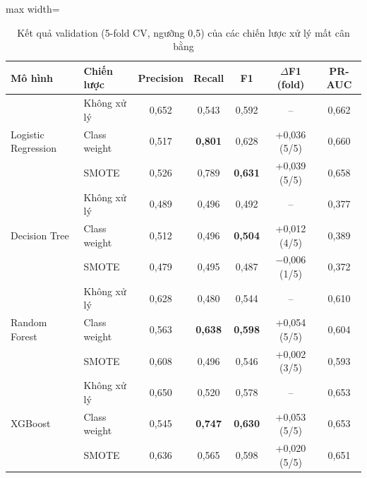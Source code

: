 \begin{table}[H]
\centering
\small
\begin{adjustbox}{max width=\textwidth}
\begin{tabular}{|l|l|c|c|c|c|c|}
\hline
\textbf{Mô hình} & \textbf{Chiến lược} & \textbf{Precision} & \textbf{Recall} & \textbf{F1} & \textbf{$\Delta$F1 (fold)} & \textbf{PR-AUC} \\
\hline
\multirow{3}{*}{Logistic Regression} & Không xử lý & 0,652 & 0,543 & 0,592 & -- & 0,662 \\
\cline{2-7}
 & Class weight & 0,517 & \textbf{0,801} & 0,628 & +0,036 (5/5) & 0,660 \\
\cline{2-7}
 & SMOTE & 0,526 & 0,789 & \textbf{0,631} & +0,039 (5/5) & 0,658 \\
\hline
\multirow{3}{*}{Decision Tree} & Không xử lý & 0,489 & 0,496 & 0,492 & -- & 0,377 \\
\cline{2-7}
 & Class weight & 0,512 & 0,496 & \textbf{0,504} & +0,012 (4/5) & 0,389 \\
\cline{2-7}
 & SMOTE & 0,479 & 0,495 & 0,487 & $-$0,006 (1/5) & 0,372 \\
\hline
\multirow{3}{*}{Random Forest} & Không xử lý & 0,628 & 0,480 & 0,544 & -- & 0,610 \\
\cline{2-7}
 & Class weight & 0,563 & \textbf{0,638} & \textbf{0,598} & +0,054 (5/5) & 0,604 \\
\cline{2-7}
 & SMOTE & 0,608 & 0,496 & 0,546 & +0,002 (3/5) & 0,593 \\
\hline
\multirow{3}{*}{XGBoost} & Không xử lý & 0,650 & 0,520 & 0,578 & -- & 0,653 \\
\cline{2-7}
 & Class weight & 0,545 & \textbf{0,747} & \textbf{0,630} & +0,053 (5/5) & 0,653 \\
\cline{2-7}
 & SMOTE & 0,636 & 0,565 & 0,598 & +0,020 (5/5) & 0,651 \\
\hline
\end{tabular}
\end{adjustbox}
\caption{Kết quả validation (5-fold CV, ngưỡng 0,5) của các chiến lược xử lý mất cân bằng}
\label{tab:imbalance}
\end{table}

